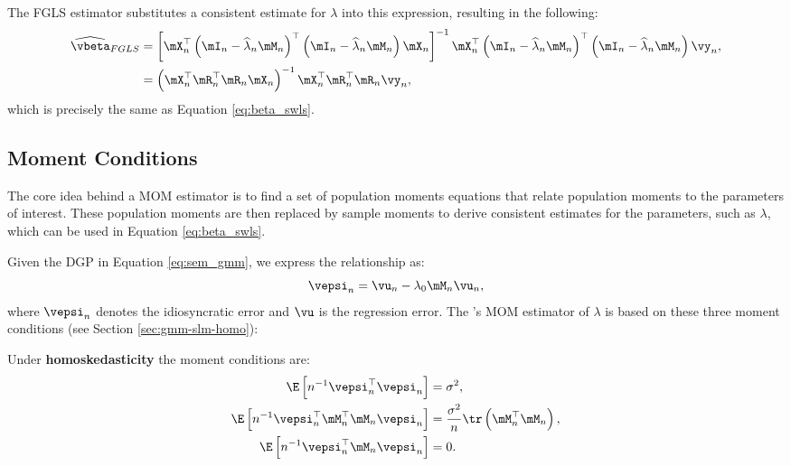 \documentclass[english,12pt]{book}\usepackage[]{graphicx}\usepackage[]{xcolor}
\begin{document}
The FGLS estimator substitutes a consistent estimate for $\lambda$ into this expression, resulting in the following:
\begin{equation*}
\begin{aligned}
  \widehat{\vbeta}_{FGLS} & =\left[\mX^\top_n\left(\mI_n - \widehat{\lambda}_n\mM_n\right)^\top\left(\mI_n - \widehat{\lambda}_n\mM_n\right)\mX_n\right]^{-1}\mX^\top_n\left(\mI_n - \widehat{\lambda}_n\mM_n\right)^\top\left(\mI_n - \widehat{\lambda}_n\mM_n\right)\vy_n, \\
  & = \left(\mX_n^\top \mR_{n}^\top\mR_{n}\mX_n\right)^{-1} \mX_n^\top \mR_{n}^\top\mR_{n}\vy_n,
  \end{aligned}
\end{equation*}
%
which is precisely the same as Equation \eqref{eq:beta_swls}.

\subsection{Moment Conditions}\label{section:Moment_Condtions}

The core idea behind a MOM estimator is to find a set of population moments equations that relate population moments to the parameters of interest. These population moments are then replaced by sample moments to derive consistent estimates for the parameters, such as $\lambda$, which can be used in Equation \eqref{eq:beta_swls}.

Given the DGP in Equation \eqref{eq:sem_gmm}, we express the relationship as: 
\begin{equation*}
  \vepsi_n = \vu_n - \lambda_0\mM_n\vu_n,
\end{equation*}
%
where $\vepsi_n$ denotes the idiosyncratic error and $\vu$ is the regression error. The \cite{kelejian1999generalized}'s MOM estimator of $\lambda$ is based on these three moment conditions  (see Section \ref{sec:gmm-slm-homo}):

\begin{definition}\label{def:moment-conditions-homo}
Under \textbf{homoskedasticity} \citep{kelejian1999generalized} the moment conditions are:
\begin{equation*}
  \begin{aligned}
  \E\left[n^{-1}\vepsi^\top_n \vepsi_n\right] &= \sigma^2, \\
   \E\left[n^{-1}\vepsi^\top_n\mM_n^\top\mM_n\vepsi_n\right] &= \frac{\sigma^2}{n}\tr\left(\mM^\top_n\mM_n\right),\\
   \E\left[n^{-1}\vepsi^\top_n \mM_n \vepsi_n \right] & =  0.
  \end{aligned}
\end{equation*}
\end{definition}
\end{document}
